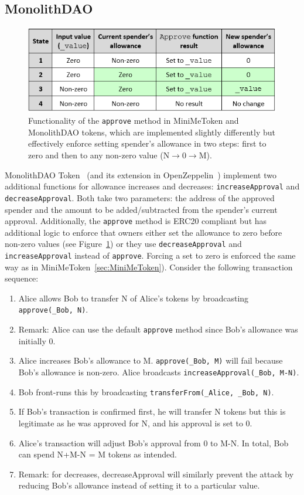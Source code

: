\subsection{MonolithDAO}
\label{sec:mdao}

\begin{figure}[t]
	\centering
	\includegraphics[width=1.0\linewidth]{figures/multiple_withdrawal_09.png}
	\caption{Functionality of the \texttt{approve} method in MiniMeToken and MonolithDAO tokens, which are implemented slightly differently but effectively enforce setting spender's allowance in two steps: first to zero and then to any non-zero value (\eg N$\rightarrow$0$\rightarrow$M).\label{fig:dao}}
\end{figure}

MonolithDAO Token~\cite{Ref12} (and its extension in OpenZeppelin~\cite{Ref10}) implement two additional functions for allowance increases and decreases: \texttt{increaseApproval} and \texttt{decreaseApproval}. Both take two parameters: the address of the approved spender and the amount to be added/subtracted from the spender's current approval. Additionally, the \texttt{approve} method is ERC20 compliant but has additional logic to enforce that owners either set the allowance to zero before non-zero values (see Figure~\ref{fig:dao}) or they use \texttt{decreaseApproval} and \texttt{increaseApproval} instead of \texttt{approve}. Forcing a set to zero is enforced the same way as in MiniMeToken~\ref{sec:MiniMeToken}). Consider the following transaction sequence:

\begin{enumerate}
	\item Alice allows Bob to transfer N of Alice's tokens by broadcasting \texttt{approve(\_Bob, N)}. 
	\item Remark: Alice can use the default \texttt{approve} method since Bob’s allowance was initially 0.
	\item Alice increases Bob’s allowance to M. \texttt{approve(\_Bob, M)} will fail because Bob's allowance is non-zero. Alice broadcasts \texttt{increaseApproval(\_Bob, M-N)}.
	\item Bob front-runs this by broadcasting \texttt{transferFrom(\_Alice, \_Bob, N)}.
	\item If Bob's transaction is confirmed first, he will transfer N tokens but this is legitimate as he was approved for N, and his approval is set to 0.
	\item Alice's transaction will adjust Bob's approval from 0 to M-N. In total, Bob can spend N+M-N = M tokens as intended.
	\item Remark: for decreases, decreaseApproval will similarly prevent the attack by reducing Bob's allowance instead of setting it to a particular value.
\end{enumerate}

